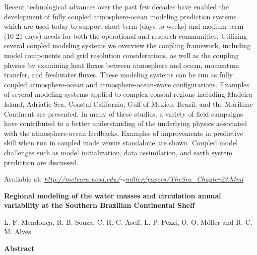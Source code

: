 \noindent Recent technological advances over the past few decades have enabled the development of fully coupled atmosphere-ocean modeling prediction systems which are used today to support 
          short-term (days to weeks) and medium-term (10-21 days) needs for both the operational and research communities. Utilizing several coupled modeling systems we overview the coupling 
          framework, including model components and grid resolution considerations, as well as the coupling physics by examining heat fluxes between atmosphere and ocean, momentum transfer, 
          and freshwater fluxes. These modeling systems can be run as fully coupled atmosphere-ocean and atmosphere-ocean-wave configurations. Examples of several modeling systems applied to 
          complex coastal regions including Madeira Island, Adriatic Sea, Coastal California, Gulf of Mexico, Brazil, and the Maritime Continent are presented. In many of these studies, a 
          variety of field campaigns have contributed to a better understanding of the underlying physics associated with the atmosphere-ocean feedbacks. Examples of improvements in predictive 
          skill when run in coupled mode versus standalone are shown. Coupled model challenges such as model initialization, data assimilation, and earth system prediction are discussed.
\bigskip

\noindent \textcolor{black}{}
\bigskip

\noindent Avaliable at: \textcolor{bleu_cite}{\href{http://meteora.ucsd.edu/$\sim$miller/papers/TheSea\_Chapter23.html}{\textit{http://meteora.ucsd.edu/$\sim$miller/papers/TheSea\_Chapter23.html}}}
\bigskip

\newpage
\bigskip

\noindent \begin{center} \textbf{Regional modeling of the water masses and circulation annual variability at the Southern Brazilian Continental Shelf}
\bigskip

\noindent L. F. Mendonça, R. B. Souza, C. R. C. Aseff, L. P. Pezzi, O. O. Möller and R. C. M. Alves
\bigskip

\noindent \textbf{Abstract}\end{center}
\bigskip

